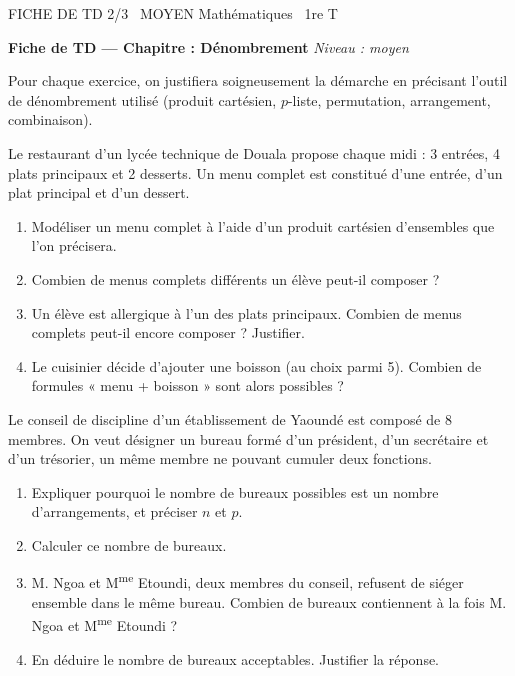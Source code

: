 \documentclass[11pt]{article}
\begin{document}
\begin{tcolorbox}[enhanced,colback=popink,colframe=popink,arc=10pt,boxrule=0pt,left=12pt,right=12pt,top=9pt,bottom=9pt]
{\color{white}\popxbold\small FICHE DE TD 2/3 \textbullet\ MOYEN \hfill Mathématiques \textbullet\ 1re T\par}
\end{tcolorbox}
\vspace{4pt}
\textbf{Fiche de TD — Chapitre : Dénombrement} \hfill \textit{Niveau : moyen}

\smallskip
Pour chaque exercice, on justifiera soigneusement la démarche en précisant l'outil de dénombrement utilisé (produit cartésien, $p$-liste, permutation, arrangement, combinaison).

\begin{exercice}
Le restaurant d'un lycée technique de Douala propose chaque midi : 3 entrées, 4 plats principaux et 2 desserts. Un menu complet est constitué d'une entrée, d'un plat principal et d'un dessert.
\begin{enumerate}
\item Modéliser un menu complet à l'aide d'un produit cartésien d'ensembles que l'on précisera.
\item Combien de menus complets différents un élève peut-il composer ?
\item Un élève est allergique à l'un des plats principaux. Combien de menus complets peut-il encore composer ? Justifier.
\item Le cuisinier décide d'ajouter une boisson (au choix parmi 5). Combien de formules « menu + boisson » sont alors possibles ?
\end{enumerate}
\end{exercice}

\begin{exercice}
Le conseil de discipline d'un établissement de Yaoundé est composé de 8 membres. On veut désigner un bureau formé d'un président, d'un secrétaire et d'un trésorier, un même membre ne pouvant cumuler deux fonctions.
\begin{enumerate}
\item Expliquer pourquoi le nombre de bureaux possibles est un nombre d'arrangements, et préciser $n$ et $p$.
\item Calculer ce nombre de bureaux.
\item M. Ngoa et M\textsuperscript{me} Etoundi, deux membres du conseil, refusent de siéger ensemble dans le même bureau. Combien de bureaux contiennent à la fois M. Ngoa et M\textsuperscript{me} Etoundi ?
\item En déduire le nombre de bureaux acceptables. Justifier la réponse.
\end{enumerate}
\end{exercice}
\end{document}
